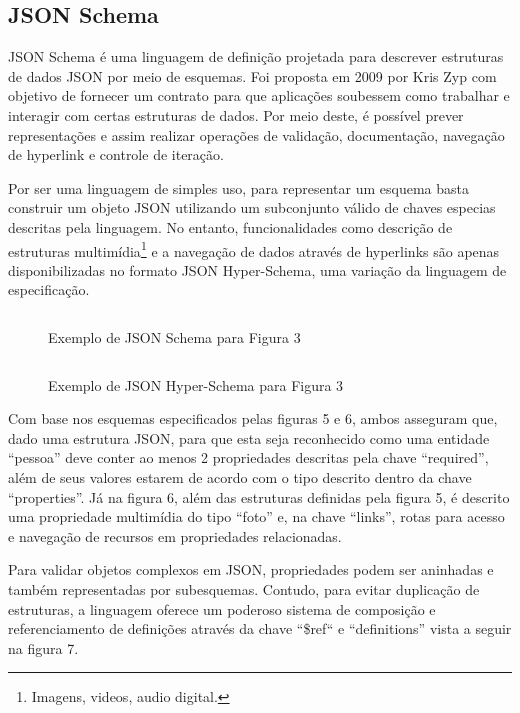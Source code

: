 \subsection[JSON Schema]{JSON Schema}

JSON Schema é uma linguagem de definição projetada para descrever estruturas de dados JSON por meio de esquemas. Foi proposta em 2009 por Kris Zyp com objetivo de fornecer um contrato para que aplicações soubessem como trabalhar e interagir com certas estruturas de dados. Por meio deste, é possível prever representações e assim realizar operações de validação, documentação, navegação de hyperlink e controle de iteração.

Por ser uma linguagem de simples uso, para representar um esquema basta construir um objeto JSON utilizando um subconjunto válido de chaves especias descritas pela linguagem. No entanto, funcionalidades como descrição de estruturas multimídia\footnote{
  Imagens, videos, audio digital.
} e a navegação de dados através de hyperlinks são apenas disponibilizadas no formato JSON Hyper-Schema, uma variação da linguagem de especificação. \cite{Jackson2016}

\begin{figure}[h]
  \centering
  \inputminted[frame=single,framesep=10pt]{javascript}{anexos/pessoa-schema.json}
  \caption{Exemplo de JSON Schema para Figura 3}
\end{figure}

\begin{figure}[h]
  \centering
  \inputminted[frame=single,framesep=10pt]{javascript}{anexos/pessoa-hyper-schema.json}
  \caption{Exemplo de JSON Hyper-Schema para Figura 3}
\end{figure}

Com base nos esquemas especificados pelas figuras 5 e 6, ambos asseguram que, dado uma estrutura JSON, para que esta seja reconhecido como uma entidade “pessoa” deve conter ao menos 2 propriedades descritas pela chave “required”, além de seus valores estarem de acordo com o tipo descrito dentro da chave “properties”. Já na figura 6, além das estruturas definidas pela figura 5, é descrito uma propriedade multimídia do tipo “foto” e, na chave “links”, rotas para acesso e navegação de recursos em propriedades relacionadas.

Para validar objetos complexos em JSON, propriedades podem ser aninhadas e também representadas por subesquemas. Contudo, para evitar duplicação de estruturas, a linguagem oferece um poderoso sistema de composição e referenciamento de definições através da chave “\$ref“ e “definitions” vista a seguir na figura 7. \cite{Droettboom2015}


